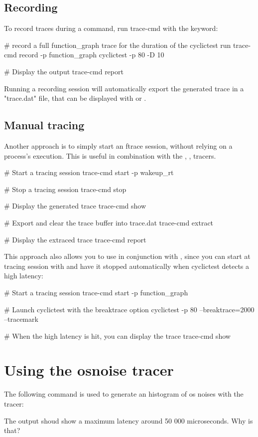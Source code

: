 \subsection{Recording}

To record traces during a command, run trace-cmd with the  keyword:

\begin{bashinput}
# record a full function_graph trace for the duration of the cyclictest run
trace-cmd record -p function_graph cyclictest -p 80 -D 10

# Display the output
trace-cmd report
\end{bashinput}

Running a recording session will automatically export the generated trace in a
"trace.dat" file, that can be displayed with  or .

\subsection{Manual tracing}

Another approach is to simply start an ftrace session, without relying on a process's
execution. This is useful in combination with the , ,  tracers.

\begin{bashinput}
	# Start a tracing session
	trace-cmd start -p wakeup_rt

	# Stop a tracing session
	trace-cmd stop

	# Display the generated trace
	trace-cmd show

	# Export and clear the trace buffer into trace.dat
	trace-cmd extract

	# Display the extraced trace
	trace-cmd report
\end{bashinput}

This approach also allows you to use  in conjunction with ,
since you can start at tracing session with  and have it
stopped automatically when cyclictest detects a high latency:

\begin{bashinput}
	# Start a tracing session
	trace-cmd start -p function_graph

	# Launch cyclictest with the breaktrace option
	cyclictest -p 80 --breaktrace=2000 --tracemark

	# When the high latency is hit, you can display the trace
	trace-cmd show
\end{bashinput}

\section{Using the osnoise tracer}

The following command is used to generate an histogram of os noises with the 
 tracer:


The output shoud show a maximum latency around 50 000 microseconds. Why is that?

